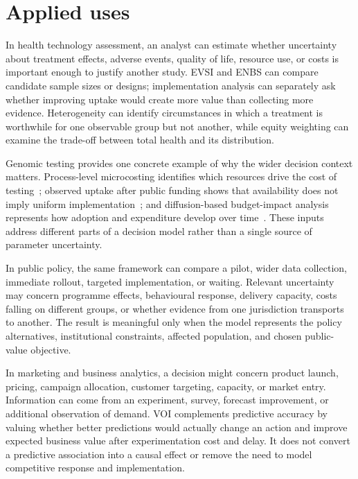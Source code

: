 \section{Applied uses}

In health technology assessment, an analyst can estimate whether uncertainty
about treatment effects, adverse events, quality of life, resource use, or
costs is important enough to justify another study. EVSI and ENBS can compare
candidate sample sizes or designs; implementation analysis can separately ask
whether improving uptake would create more value than collecting more
evidence. Heterogeneity can identify circumstances in which a treatment is
worthwhile for one observable group but not another, while equity weighting
can examine the trade-off between total health and its distribution.

Genomic testing provides one concrete example of why the wider decision
context matters. Process-level microcosting identifies which resources drive
the cost of testing~\cite{mordaunt2024microcosting}; observed uptake after
public funding shows that availability does not imply uniform
implementation~\cite{mordaunt2023uptake}; and diffusion-based budget-impact
analysis represents how adoption and expenditure develop over
time~\cite{mordaunt2026budget}. These inputs address different parts of a
decision model rather than a single source of parameter uncertainty.

In public policy, the same framework can compare a pilot, wider data
collection, immediate rollout, targeted implementation, or waiting. Relevant
uncertainty may concern programme effects, behavioural response, delivery
capacity, costs falling on different groups, or whether evidence from one
jurisdiction transports to another. The result is meaningful only when the
model represents the policy alternatives, institutional constraints, affected
population, and chosen public-value objective.

In marketing and business analytics, a decision might concern product launch,
pricing, campaign allocation, customer targeting, capacity, or market entry.
Information can come from an experiment, survey, forecast improvement, or
additional observation of demand. VOI complements predictive accuracy by
valuing whether better predictions would actually change an action and improve
expected business value after experimentation cost and delay. It does not
convert a predictive association into a causal effect or remove the need to
model competitive response and implementation.

